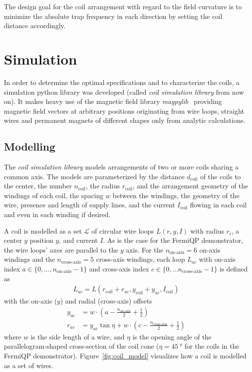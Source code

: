 The design goal for the coil arrangement with regard to the field curvature is to minimize the absolute trap frequency in each direction by setting the coil distance accordingly.

\section{Simulation}\label{ch:simulation}
In order to determine the optimal specifications and to characterize the coils, a simulation python library was developed (called \textit{coil simulation library} from now on). It makes heavy use of the magnetic field library \textit{magpylib}~\cite{ortner_magpylib_2020, noauthor_magpylibmagpylib_2022} providing magnetic field vectors at arbitrary positions originating from wire loops, straight wires and permanent magnets of different shapes only from analytic calculations.

\subsection*{Modelling}
The \textit{coil simulation library} models arrangements of two or more coils sharing a common axis. The models are parameterized by the distance $d_\text{coil}$ of the coils to the center, the number $n_\text{coil}$, the radius $r_\text{coil}$, and the arrangement geometry of the windings of each coil, the spacing $w$ between the windings, the geometry of the wire, presence and length of supply lines, and the current $I_\text{coil}$ flowing in each coil and even in each winding if desired.

A coil is modelled as a set $\mathcal{L}$ of circular wire loops $L(r, y, I)$ with radius $r_i$, a center $y$ position $y$, and current $I$. As is the case for the FermiQP demonstrator, the wire loops' axes are parallel to the $y$ axis. For the $n_\text{on-axis} = 6$ on-axis windings and the $n_\text{cross-axis} = 5$ cross-axis windings, each loop $L_{ac}$ with on-axis index $a \in \{0, \ldots, n_\text{on-axis} - 1\}$ and cross-axis index $c \in \{0, \ldots n_\text{cross-axis} - 1\}$ is defined as
\begin{align}
    L_{ac} = L \left(r_\text{coil} + r_{ac}, y_\text{coil} + y_{ac}, I_\text{coil}\right)
\end{align}
with the on-axis ($y$) and radial (cross-axis) offsets
\begin{align}
    \label{eq:coil_model_yac}
    y_{ac} &= w\cdot \left(a-\frac{n_\text{on-axis}}{2} + \frac{1}{2}\right) \\
    \label{eq:coil_model_rac}
    r_{ac} &= y_{ac} \tan \eta + w \cdot \left(c - \frac{n_\text{cross-axis}}{2} + \frac{1}{2}\right)
\end{align}
where $w$ is the side length of a wire, and $\eta$ is the opening angle of the parallelogram-shaped cross-section of the coil cone ($\eta = \SI{45}{\degree}$ for the coils in the FermiQP demonstrator). Figure~\ref{fig:coil_model} visualizes how a coil is modelled as a set of wires.

